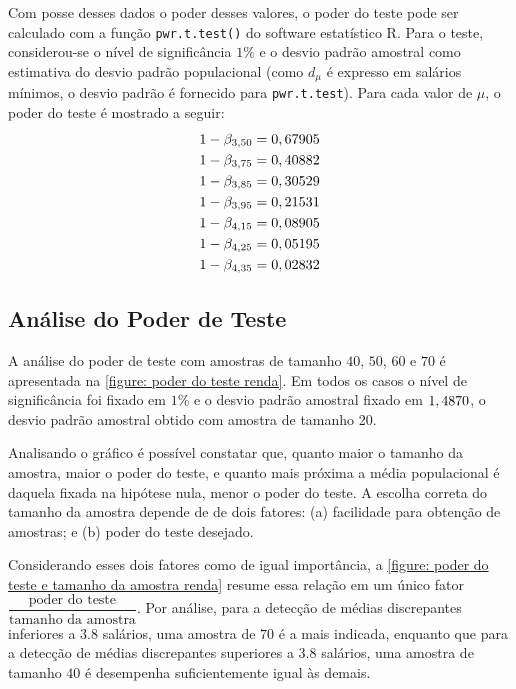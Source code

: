 	Com posse desses dados o poder desses valores, o poder do teste
    pode ser calculado com a função \texttt{pwr.t.test()} do software
    estatístico R. Para o teste, considerou-se o nível de
    significância $1\%$ e o desvio padrão amostral como estimativa do
    desvio padrão populacional (como $d_\mu$ é expresso em salários
    mínimos, o desvio padrão é fornecido para
    \texttt{pwr.t.test}). Para cada valor de $\mu$, o poder do teste é
    mostrado a seguir:
	\begin{align*}
		1 - \beta_{3,50} &= 0,67905\\
		1 - \beta_{3,75} &= 0,40882\\
		1 - \beta_{3,85} &= 0,30529\\
		1 - \beta_{3,95} &= 0,21531\\
		1 - \beta_{4,15} &= 0,08905\\
		1 - \beta_{4,25} &= 0,05195\\
		1 - \beta_{4,35} &= 0,02832\\
	\end{align*}

\subsection{Análise do Poder de Teste}

	A análise do poder de teste com amostras de tamanho $40$, $50$, $60$ e $70$
	é apresentada na \autoref{figure: poder do teste renda}. Em todos os casos o
	nível de significância foi fixado em $1\%$ e o desvio padrão amostral fixado
	em $1,4870$, o desvio padrão amostral obtido com amostra de
	tamanho 20.

	Analisando o gráfico é possível constatar que, quanto maior o tamanho da
	amostra, maior o poder do teste, e quanto mais próxima a média populacional
	é daquela fixada na hipótese nula, menor o poder do teste. A escolha correta
	do tamanho da amostra depende de de dois fatores: (a) facilidade para
	obtenção de amostras; e (b) poder do teste desejado.
	
	Considerando esses dois fatores como de igual importância, a
    \autoref{figure: poder do teste e tamanho da amostra renda} resume
    essa relação em um único fator $\dfrac{\text{poder do
        teste}}{\text{tamanho da amostra}}$. Por análise, para a detecção de
    médias discrepantes inferiores a $3.8$ salários, uma amostra de $70$ é
    a mais indicada, enquanto que para a detecção de médias discrepantes
    superiores a $3.8$ salários, uma amostra de tamanho $40$ é desempenha
    suficientemente igual às demais.

